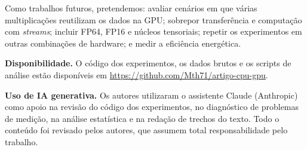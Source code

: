 \documentclass[12pt]{article}
\newif\ifrevisar \revisarfalse
\newcommand{\revisar}[1]{\ifrevisar{\color{orange!70!black}#1}\else#1\fi}
\begin{document}
Como trabalhos futuros, pretendemos: avaliar cenários em que várias
multiplicações reutilizam os dados na GPU; sobrepor transferência e computação
com \emph{streams}; incluir FP64, FP16 e núcleos tensoriais; repetir os
experimentos em outras combinações de hardware; e medir a eficiência
energética.

\textbf{Disponibilidade.} \revisar{O código dos experimentos, os dados brutos e
os scripts de análise estão disponíveis em \url{https://github.com/Mth71/artigo-cpu-gpu}.}

\textbf{Uso de IA generativa.} Os autores utilizaram o assistente Claude
(Anthropic) como apoio na revisão do código dos experimentos, no diagnóstico
de problemas de medição, na análise estatística e na redação de trechos do
texto. Todo o conteúdo foi revisado pelos autores, que assumem total
responsabilidade pelo trabalho.



\end{document}
